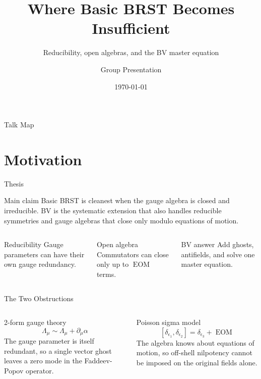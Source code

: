 \documentclass[aspectratio=169,professionalfonts]{beamer}
\title[Where Basic BRST Fails]{Where Basic BRST Becomes Insufficient}
\subtitle{Reducibility, open algebras, and the BV master equation}
\author[Group Presentation]{Group Presentation}
\institute{Gauge Field Theory by Ying Chen \\ Spring 2026}
\date{\today}
\newcommand{\EOM}{\ensuremath{\operatorname{EOM}}}
\begin{document}
\begin{frame}[plain]
  \titlepage
\end{frame}

\begin{frame}{Talk Map}
  \tableofcontents
\end{frame}

\section{Motivation}

\begin{frame}{Thesis}
  \begin{alertblock}{Main claim}
    Basic BRST is cleanest when the gauge algebra is closed and irreducible.
    BV is the systematic extension that also handles reducible symmetries and
    gauge algebras that close only modulo equations of motion.
  \end{alertblock}

  \vspace{0.25cm}
  \begin{columns}[T,onlytextwidth]
    \begin{block}{Reducibility}
      Gauge parameters can have their own gauge redundancy.
    \end{block}

    \begin{block}{Open algebra}
      Commutators can close only up to \EOM{} terms.
    \end{block}

    \begin{block}{BV answer}
      Add ghosts, antifields, and solve one master equation.
    \end{block}
  \end{columns}
\end{frame}

\begin{frame}{The Two Obstructions}
  \begin{columns}[T,onlytextwidth]
    \begin{exampleblock}{2-form gauge theory}
      \[
        \Lambda_\mu \sim \Lambda_\mu+\partial_\mu\alpha
      \]
      The gauge parameter is itself redundant, so a single vector ghost leaves
      a zero mode in the Faddeev-Popov operator.
    \end{exampleblock}

    \begin{exampleblock}{Poisson sigma model}
      \[
        [\delta_{\epsilon_1},\delta_{\epsilon_2}]
        =\delta_{\epsilon_3}+\EOM
      \]
      The algebra knows about equations of motion, so off-shell nilpotency
      cannot be imposed on the original fields alone.
    \end{exampleblock}
  \end{columns}
\end{frame}
\end{document}
